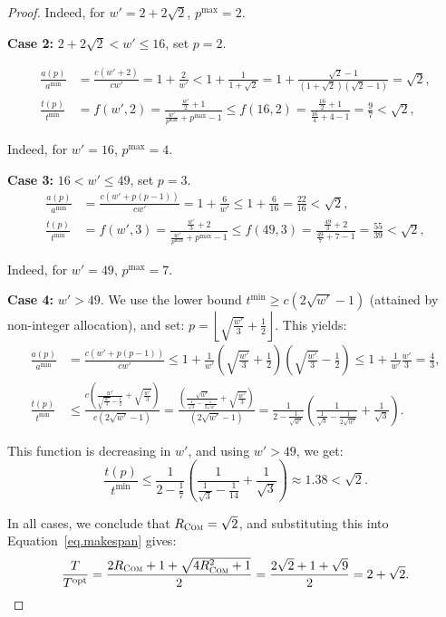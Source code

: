 \documentclass{article}
\newcommand\ratio{R\xspace}
\newcommand\opt{\textnormal{opt}\xspace}
\newcommand\COM{\textsc{Com}\xspace}
\begin{document}
\begin{proof}
Indeed, for \(w' = 2 + 2\sqrt{2}\), \(p^{\max}=2\).

\textbf{Case 2:} \(2 + 2\sqrt{2} < w' \le 16\), set \(p = 2\).

\begin{align*}
\frac{a(p)}{a^{\min}} &=\frac{c(w'+2)}{cw'}=1+\frac{2}{w'} < 1+\frac{1}{1+\sqrt{2}}=1+\frac{\sqrt{2}-1}{(1+\sqrt{2})(\sqrt{2}-1)}=\sqrt{2}, \\[6pt]
\frac{t(p)}{t^{\min}}
      &= f(w',2)
       = \frac{\tfrac{w'}{2} + 1}{\tfrac{w'}{p^{\max}} + p^{\max} - 1}
       \le f(16,2)
       = \frac{\tfrac{16}{2} + 1}{\tfrac{16}{4} + 4 - 1}
       = \frac{9}{7}
       < \sqrt{2},
\end{align*}

Indeed, for \(w' = 16\), \(p^{\max}=4\).

\textbf{Case 3:} \(16 < w' \le 49\), set \(p = 3\).
\begin{align*}
\frac{a(p)}{a^{\min}}
      &= \frac{c\!\left(w' + p(p-1)\right)}{c w'}
       = 1 + \frac{6}{w'}
       \le 1 + \frac{6}{16}
       = \frac{22}{16}
       < \sqrt{2}, \\[6pt]
\frac{t(p)}{t^{\min}}
      &= f(w',3)
       = \frac{\tfrac{w'}{3} + 2}{\tfrac{w'}{p^{\max}} + p^{\max} - 1}
       \le f(49,3)
       = \frac{\tfrac{49}{3} + 2}{\tfrac{49}{7} + 7 - 1}
       = \frac{55}{39}
       < \sqrt{2},
\end{align*}

Indeed, for \(w' = 49\), \(p^{\max}=7\).


\textbf{Case 4:} \(w' > 49\).  
We use the lower bound \(t^{\min} \ge c(2\sqrt{w'} - 1)\) (attained by non-integer allocation), and set:
\(
p = \left\lfloor \sqrt{\frac{w'}{3}} + \frac{1}{2} \right\rfloor.
\)
This yields:
\begin{align*}
\frac{a(p)}{a^{\min}}&=\frac{c(w'+p(p-1))}{cw'}\leq 1+\frac{1}{w'}\left( \sqrt{\frac{w'}{3}}+\frac{1}{2}\right)\left(\sqrt{\frac{w'}{3}}-\frac{1}{2}\right)\leq 1+\frac{1}{w'}\frac{w'}{3} = \frac{4}{3}, \\[6pt]
\frac{t(p)}{t^{\min}} &\leq \frac{c\left(\frac{w'}{\sqrt{\frac{w'}{3}}-\frac{1}{2}} +\sqrt{\frac{w'}{3}}\right)}{c(2\sqrt{w'}-1)}= \frac{\left(\frac{\sqrt{w'}}{\frac{1}{\sqrt{3}}-\frac{1}{2\sqrt{w'}}} +\sqrt{\frac{w'}{3}}\right)}{(2\sqrt{w'}-1)}=\frac{1}{2-\frac{1}{\sqrt{w'}}}\left(\frac{1}{\frac{1}{\sqrt{3}}-\frac{1}{2\sqrt{w'}}} +\frac{1}{\sqrt{3}}\right).
\end{align*}

This function is decreasing in \(w'\), and using \(w' > 49\), we get:
\[
\frac{t(p)}{t^{\min}} \le \frac{1}{2 - \frac{1}{7}} \left( \frac{1}{\frac{1}{\sqrt{3}} - \frac{1}{14}} + \frac{1}{\sqrt{3}} \right) \approx 1.38 < \sqrt{2}.
\]

In all cases, we conclude that $\ratio_{\COM} = \sqrt{2}$, and substituting this into Equation~\ref{eq.makespan} gives:
\[
\frac{T}{T^{\opt}} = \frac{2\ratio_{\COM} + 1 + \sqrt{4\ratio_{\COM}^2 + 1}}{2} = \frac{2\sqrt{2} + 1 + \sqrt{9}}{2} = 2 + \sqrt{2}.
\]
\end{proof}
\end{document}
